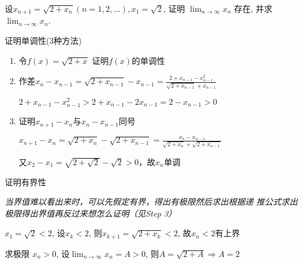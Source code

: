 \documentclass{ctexart}
\begin{document}
\begin{ques}[date=2020-8-20]
  设$x_{n + 1} = \sqrt{2 + x_n} (n = 1, 2, \dotsc), x_1 = \sqrt{2}$, 证明
  $\lim_{n \to \infty} x_n$ 存在, 并求$\lim_{n \to \infty} x_n$.
  \begin{solution}
    \begin{step}{证明单调性(3种方法)}
      \begin{enumerate}
        \item 令$f(x) = \sqrt{2 + x}$ 证明$f(x)$的单调性
        \item 作差$x_{n} - x_{n - 1} = \sqrt{2 + x_{n - 1}} - x_{n - 1} = \frac{2
          + x_{n - 1} - x_{n - 1}^2}{\sqrt{2 + x_{n - 1}} + x_{n - 1}}$\par
          $2 + x_{n - 1} - x_{n - 1}^2 > 2 + x_{n - 1} - 2x_{n - 1} = 2 - x_{n
          - 1} > 0$\par
        \item 证明$x_{n + 1} - x_n$与$x_{n} - x_{n - 1}$同号\par
          $x_{n + 1} - x_n = \sqrt{2 + x_n} - \sqrt{2 + x_{n - 1}} = \frac{x_n
          - x_{n - 1}}{\sqrt{2 + x_n} + \sqrt{2 + x_{n - 1}}}$\par
          又$x_2 - x_1 = \sqrt{2 + \sqrt{2}} - \sqrt{2} > 0$，故$x_n$单调
      \end{enumerate}
    \end{step}
    \begin{step}{证明有界性}
      \begin{ideabox}
        \itshape 当界值难以看出来时，可以先假定有界，得出有极限然后求出根据递
        推公式求出极限得出界值再反过来想怎么证明（见Step 3）
      \end{ideabox}
      $x_1 = \sqrt{2} < 2$, 设$x_k < 2$, 则$x_{k + 1} = \sqrt{2 + x_k} < 2$,
      故$x_n < 2$有上界
    \end{step}
    \begin{step}{求极限}
      $x_n > 0$, 设$\lim_{n \to \infty} x_n = A > 0$, 则$A = \sqrt{2 + A} \Rightarrow A = 2$
    \end{step}
  \end{solution}
\end{ques}
\end{document}
